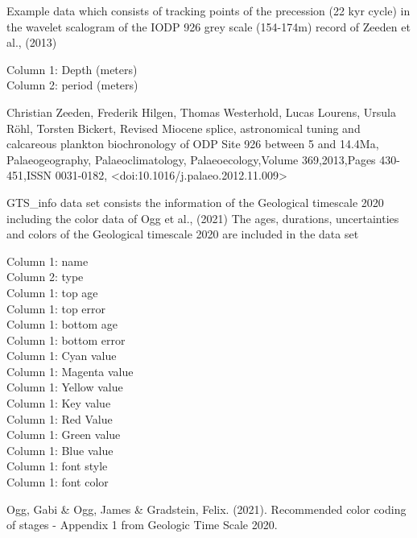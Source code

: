 \documentclass[a4paper]{book}
\begin{document}
%
\begin{Description}
Example data which consists of tracking points of the precession (22 kyr cycle) in the wavelet
scalogram of the IODP 926 grey scale (154-174m) record of Zeeden et al., (2013)
\end{Description}
%
\begin{Details}
Column 1: Depth (meters)\\{}
Column 2: period (meters)\\{}
\end{Details}
%
\begin{References}
Christian Zeeden, Frederik Hilgen, Thomas Westerhold, Lucas Lourens, Ursula Röhl, Torsten Bickert,
Revised Miocene splice, astronomical tuning and calcareous plankton biochronology of ODP Site 926 between 5 and 14.4Ma,
Palaeogeography, Palaeoclimatology, Palaeoecology,Volume 369,2013,Pages 430-451,ISSN 0031-0182,
<doi:10.1016/j.palaeo.2012.11.009>
\end{References}
%
\begin{Description}
GTS\_info data set consists the information of the Geological
timescale 2020 including the color data of Ogg et al., (2021)
The ages, durations, uncertainties and colors of the Geological
timescale 2020 are included in the data set
\end{Description}
%
\begin{Details}
Column 1: name	\\{}
Column 2: type	\\{}
Column 1: top age\\{}
Column 1: top error\\{}
Column 1: bottom age\\{}
Column 1: bottom error\\{}
Column 1: Cyan value\\{}
Column 1: Magenta value\\{}
Column 1: Yellow value\\{}
Column 1: Key  value\\{}
Column 1: Red Value\\{}
Column 1: Green value\\{}
Column 1: Blue value	\\{}
Column 1: font style	\\{}
Column 1: font color\\{}
\end{Details}
%
\begin{References}
Ogg, Gabi \& Ogg, James \& Gradstein, Felix. (2021).
Recommended color coding of stages - Appendix 1
from Geologic Time Scale 2020.
\end{References}
\end{document}
